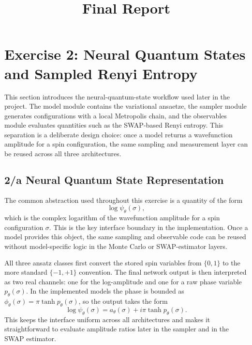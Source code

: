 \documentclass[11pt,a4paper]{article}
\title{Final Report}
\author{}
\date{}
\begin{document}
\maketitle

\section*{Exercise 2: Neural Quantum States and Sampled Renyi Entropy}

This section introduces the neural-quantum-state workflow used later in the project. The model module contains the variational ansaetze, the sampler module generates configurations with a local Metropolis chain, and the observables module evaluates quantities such as the SWAP-based Renyi entropy. This separation is a deliberate design choice: once a model returns a wavefunction amplitude for a spin configuration, the same sampling and measurement layer can be reused across all three architectures.

\subsection*{2/a Neural Quantum State Representation}

The common abstraction used throughout this exercise is a quantity of the form
\begin{equation}
    \log \psi_\theta(\sigma),
\end{equation}
which is the complex logarithm of the wavefunction amplitude for a spin configuration $\sigma$. This is the key interface boundary in the implementation. Once a model provides this object, the same sampling and observable code can be reused without model-specific logic in the Monte Carlo or SWAP-estimator layers.

All three ansatz classes first convert the stored spin variables from $\{0,1\}$ to the more standard $\{-1,+1\}$ convention. The final network output is then interpreted as two real channels: one for the log-amplitude and one for a raw phase variable $p_\theta(\sigma)$. In the implemented models the phase is bounded as $\phi_\theta(\sigma)=\pi \tanh p_\theta(\sigma)$, so the output takes the form
\begin{equation}
    \log \psi_\theta(\sigma) = a_\theta(\sigma) + i \pi \tanh p_\theta(\sigma).
\end{equation}
This keeps the interface uniform across all architectures and makes it straightforward to evaluate amplitude ratios later in the sampler and in the SWAP estimator.
\end{document}
